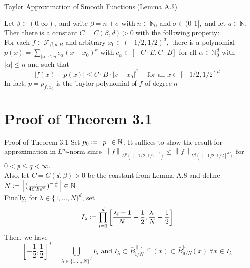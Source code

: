 \documentclass{if-beamer}
\newcommand{\defeq}{\vcentcolon=}
\newcommand{\norm}[2]{\left\lVert#1\right\rVert_{#2}}
\begin{document}
\begin{frame}{Taylor Approximation of Smooth Functions (Lemma A.8)}
    \begin{tcolorbox}
        Let $\beta \in(0, \infty),$ and write $\beta=n+\sigma$ with $n \in \mathbb{N}_{0}$ and $\sigma \in(0,1],$ and let $d \in \mathbb{N} .$ Then there is a constant $C=C(\beta, d)>0$ with the following property:\\
        For each $f \in \mathcal{F}_{\beta, d, B}$ and arbitrary $x_{0} \in(-1 / 2,1 / 2)^{d},$ there is a polynomial $p(x)=\sum_{|\alpha| \leq n} c_{\alpha}\left(x-x_{0}\right)^{\alpha}$ with $c_{\alpha} \in[-C \cdot B, C \cdot B]$ for all $\alpha \in \mathbb{N}_{0}^{d}$ with $|\alpha| \leq n$ and such that
        \[
        |f(x)-p(x)| \leq C \cdot B \cdot\left|x-x_{0}\right|^{\beta} \quad \text { for all } x \in[-1 / 2,1 / 2]^{d}
        \]
        In fact, $p=p_{f, x_{0}}$ is the Taylor polynomial of $f$ of degree $n$
    \end{tcolorbox}
    
\end{frame}


\section{Proof of Theorem 3.1}

\begin{frame}{Proof of Theorem 3.1}
    Set $p_0 \defeq \left\lceil p \right\rceil \in \mathbb{N}$. It suffices to show the result for approximation in $L^{p_0}$-norm since $\norm{f}{L^p\left([-1/2, 1/2]^{d}\right)} \leq \norm{f}{L^q\left([-1/2, 1/2]^{d}\right)}$ for $0<p\leq q <\infty$.\\
    Also, let $C=C(d, \beta) > 0$ be the constant from Lemma A.8 and define $N \defeq \left\lceil (\frac{\varepsilon}{4CBd^{\beta}})^{-\frac{1}{\beta}} \right\rceil \in \mathbb{N}$.\\
    Finally, for $\lambda \in \{1,\dots,N\}^d$, set $$I_{\lambda} \defeq \prod_{i=1}^d \left[ \frac{\lambda_i - 1}{N} - \frac{1}{2}, \frac{\lambda_i}{N} - \frac{1}{2} \right] $$
    Then, we have $$\left[-\frac{1}{2}, \frac{1}{2} \right]^d = \bigcup_{\lambda \in \{1,\dots,N\}^d}I_{\lambda} \text{ and } I_{\lambda} \subset \bar{B}_{1 / N}^{\|\cdot\|_{\ell^{\infty}}}(x) \subset \bar{B}_{d / N}^{|\cdot|}(x) \ \forall x \in I_{\lambda}  $$
\end{frame}
\end{document}
